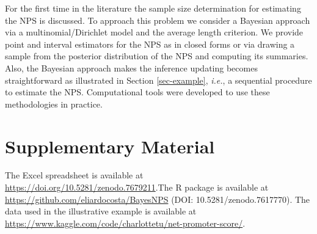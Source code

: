 \documentclass[12pt,a4paper]{article}%
\begin{document}
For the first time in the literature the sample size determination for estimating the NPS is discussed. To approach this problem we consider a Bayesian approach via a multinomial/Dirichlet model and the average length criterion. We provide point and interval estimators for the NPS as in closed forms or via drawing a sample from the posterior distribution of the NPS and computing its summaries. Also, the Bayesian approach makes the inference updating becomes straightforward as illustrated in Section \ref{sec-example}, {\it i.e.}, a sequential procedure to estimate the NPS. Computational tools were developed to use these methodologies in practice.



\section*{Supplementary Material}

The Excel spreadsheet is available at \url{https://doi.org/10.5281/zenodo.7679211}.The R package is available at \url{https://github.com/eliardocosta/BayesNPS} (DOI: 10.5281/zenodo.7617770). The data used in the illustrative example is available at \url{https://www.kaggle.com/code/charlottetu/net-promoter-score/}.




\end{document}
